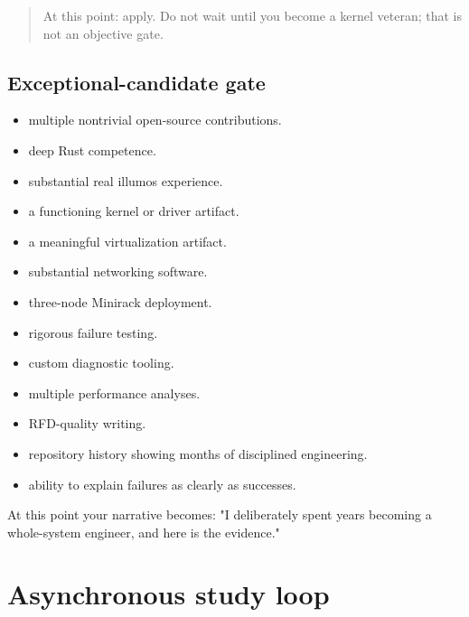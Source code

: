 \documentclass[11pt,letterpaper]{article}
\begin{document}
\begin{quote}
At this point: apply. Do not wait until you become a kernel veteran; that is not an objective gate.
\end{quote}

\subsection*{Exceptional-candidate gate}

\begin{itemize}

\item multiple nontrivial open-source contributions.

\item deep Rust competence.

\item substantial real illumos experience.

\item a functioning kernel or driver artifact.

\item a meaningful virtualization artifact.

\item substantial networking software.

\item three-node Minirack deployment.

\item rigorous failure testing.

\item custom diagnostic tooling.

\item multiple performance analyses.

\item RFD-quality writing.

\item repository history showing months of disciplined engineering.

\item ability to explain failures as clearly as successes.

\end{itemize}

At this point your narrative becomes: "I deliberately spent years becoming a whole-system engineer, and here is the evidence."

\section{Asynchronous study loop}\label{sec:20}
\end{document}
